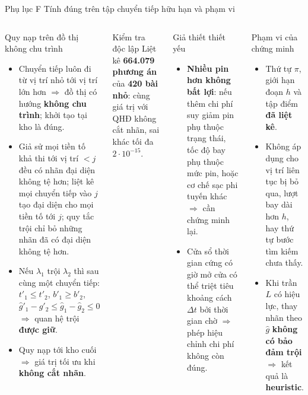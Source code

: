 \documentclass[aspectratio=169,10pt,t,xcolor={table}]{beamer}
\newcommand{\apptitle}[2]{Phụ lục #1 \textperiodcentered{} #2}
\begin{document}
\begin{frame}{\apptitle{F}{Tính đúng trên tập chuyển tiếp hữu hạn và phạm vi}}
\begin{columns}[T,onlytextwidth]
\begin{block}{Quy nạp trên đồ thị không chu trình}
\scriptsize
\begin{itemize}
\item Chuyển tiếp luôn đi từ vị trí nhỏ tới vị trí lớn hơn $\Rightarrow$ đồ thị có hướng \textbf{không chu trình}; khởi tạo tại kho là đúng.
\item Giả sử mọi tiền tố khả thi tới vị trí $<j$ đều có nhãn đại diện không tệ hơn; liệt kê mọi chuyển tiếp vào $j$ tạo đại diện cho mọi tiền tố tới $j$; quy tắc trội chỉ bỏ những nhãn đã có đại diện không tệ hơn.
\item Nếu $\lambda_1$ trội $\lambda_2$ thì sau cùng một chuyển tiếp: $t'_1\le t'_2$, $b'_1\ge b'_2$, $\widehat g'_1-\widehat g'_2\le\widehat g_1-\widehat g_2\le0$ $\Rightarrow$ quan hệ trội \textbf{được giữ}.
\item Quy nạp tới kho cuối $\Rightarrow$ giá trị tối ưu khi \textbf{không cắt nhãn}.
\end{itemize}
\end{block}
\begin{exampleblock}{Kiểm tra độc lập}
\scriptsize Liệt kê \textbf{664.079 phương án} của \textbf{420 bài nhỏ}: cùng giá trị với QHĐ không cắt nhãn, sai khác tối đa $2\cdot10^{-15}$.
\end{exampleblock}
\begin{alertblock}{Giả thiết thiết yếu}
\scriptsize
\begin{itemize}
\item \textbf{Nhiều pin hơn không bất lợi}: nếu thêm chi phí suy giảm pin phụ thuộc trạng thái, tốc độ bay phụ thuộc mức pin, hoặc cơ chế sạc phi tuyến khác $\Rightarrow$ cần chứng minh lại.
\item Cửa sổ thời gian cứng có giờ mở cửa có thể triệt tiêu khoảng cách $\Delta t$ bởi thời gian chờ $\Rightarrow$ phép hiệu chỉnh chi phí không còn đúng.
\end{itemize}
\end{alertblock}
\begin{block}{Phạm vi của chứng minh}
\scriptsize
\begin{itemize}
\item Thứ tự $\pi$, giới hạn đoạn $h$ và tập điểm \textbf{đã liệt kê}.
\item Không áp dụng cho vị trí liên tục bị bỏ qua, lượt bay dài hơn $h$, hay thứ tự bước tìm kiếm chưa thấy.
\item Khi trần $L$ có hiệu lực, thay nhãn theo $\widehat g$ \textbf{không có bảo đảm trội} $\Rightarrow$ kết quả là \textbf{heuristic}.
\end{itemize}
\end{block}
\end{columns}
\end{frame}
\end{document}
